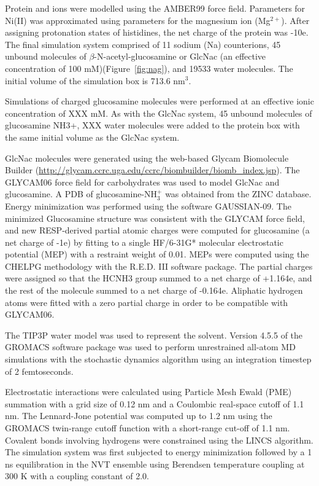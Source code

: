 Protein and ions were modelled using the AMBER99 force field. Parameters for Ni(II) was approximated using parameters for the magnesium ion (Mg$^{2+}$). After assigning protonation states of histidines, the net charge of the protein was -10e. The final simulation system comprised of 11 sodium (Na) counterions, 45 unbound molecules of $\beta$-N-acetyl-glucosamine or GlcNac (an effective concentration of 100 mM)(Figure~\ref{fig:nag}), and 19533 water molecules. The initial volume of the simulation box is 713.6 nm$^{3}$.

Simulations of charged glucosamine molecules were performed at an effective ionic concentration of XXX mM.
As with the GlcNac system, 45 unbound molecules of glucosamine NH3+, XXX water molecules were added to the protein box with the same initial volume as the GlcNac system.

GlcNac molecules were generated using the web-based Glycam Biomolecule Builder (\url{http://glycam.ccrc.uga.edu/ccrc/biombuilder/biomb_index.jsp}). The GLYCAM06 force field for carbohydrates was used to model GlcNac and glucosamine. A PDB of glucosamine-$\textrm{NH}_{3}^{+}$ was obtained from the ZINC database. Energy minimization was performed using the software GAUSSIAN-09\cite{g09}. The minimized Glucosamine structure was consistent with the GLYCAM force field, and new RESP-derived partial atomic charges were computed for glucosamine (a net charge of -1e) by fitting to a single HF/6-31G* molecular electrostatic potential (MEP) with a restraint weight of 0.01. MEPs were computed using the CHELPG methodology\cite{Breneman:1990ue} with the R.E.D. III software package\cite{Dupradeau:2010bb}. The partial charges were assigned so that the HCNH3 group summed to a net charge of +1.164e, and the rest of the molecule summed to a net charge of -0.164e. Aliphatic hydrogen atoms were fitted with a zero partial charge in order to be compatible with GLYCAM06.

The TIP3P water model was used to represent the solvent. Version 4.5.5 of the GROMACS software package was used to perform unrestrained all-atom MD simulations with the stochastic dynamics algorithm using an integration timestep of 2 femtoseconds.

Electrostatic interactions were calculated using Particle Mesh Ewald (PME) summation with a grid size of 0.12 nm and a Coulombic real-space cutoff of 1.1 nm. The Lennard-Jone potential was computed up to 1.2 nm using the GROMACS twin-range cutoff function with a short-range cut-off of 1.1 nm. Covalent bonds involving hydrogens were constrained using the LINCS algorithm. The simulation system was first subjected to energy minimization followed by a 1 ns equilibration in the NVT ensemble using Berendsen temperature coupling at 300 K with a coupling constant of 2.0.

